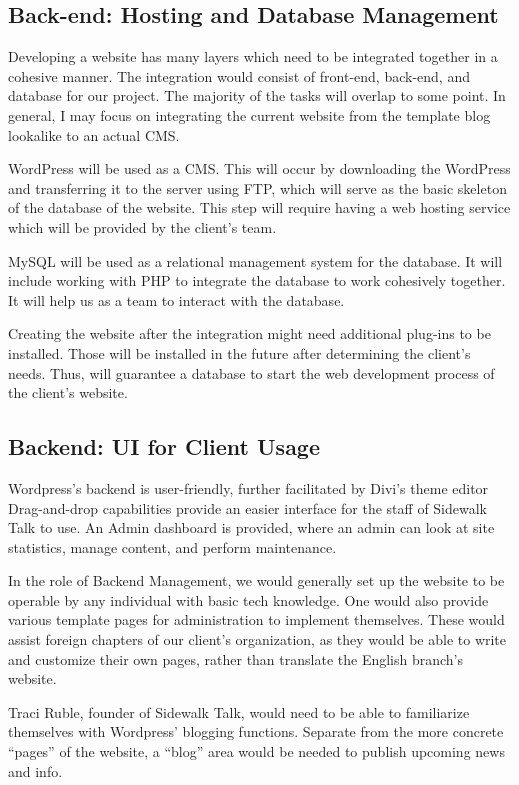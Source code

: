 \documentclass[10pt, a4paper, technote, draftclsnofoot,onecolumn ]{IEEEtran}
\begin{document}
\subsection{Back-end: Hosting and Database Management}

Developing a website has many layers which need to be integrated together in a cohesive manner. The integration would consist of front-end, back-end, and database for our project. The majority of the tasks will overlap to some point. In general, I may focus on integrating the current website from the template blog lookalike to an actual CMS.

WordPress will be used as a CMS. This will occur by downloading the WordPress and transferring it to the server using FTP, which will serve as the basic skeleton of the database of the website. This step will require having a web hosting service which will be provided by the client’s team.
 
MySQL will be used as a relational management system for the database. It will include working with PHP to integrate the database to work cohesively together. It will help us as a team to interact with the database.
 
Creating the website after the integration might need additional plug-ins to be installed. Those will be installed in the future after determining the client's needs. Thus, will guarantee a database to start the web development process of the client’s website. 



\subsection{Backend: UI for Client Usage}

Wordpress’s backend is user-friendly, further facilitated by Divi’s theme editor Drag-and-drop capabilities provide an easier interface for the staff of Sidewalk Talk to use. An Admin dashboard is provided, where an admin can look at site statistics, manage content, and perform maintenance.

In the role of Backend Management, we would generally set up the website to be operable by any individual with basic tech knowledge. One would also provide various template pages for administration to implement themselves. These would assist foreign chapters of our client’s organization, as they would be able to write and customize their own pages, rather than translate the English branch’s website.

Traci Ruble, founder of Sidewalk Talk, would need to be able to familiarize themselves with Wordpress’ blogging functions. Separate from the more concrete “pages” of the website, a “blog” area would be needed to publish upcoming news and info.
\end{document}
